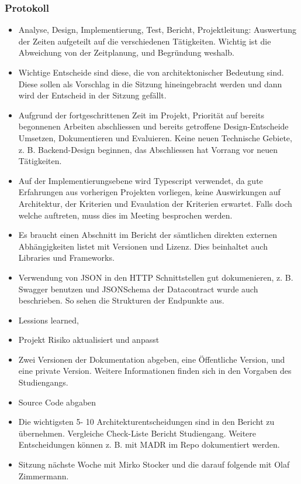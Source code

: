 \documentclass{article}
\begin{document}
\subsubsection{Protokoll}
\begin{itemize}
    \item Analyse, Design, Implementierung, Test, Bericht, Projektleitung: Auswertung der Zeiten aufgeteilt auf die verschiedenen Tätigkeiten. Wichtig ist die Abweichung von der Zeitplanung, und Begründung weshalb.
    \item Wichtige Entscheide sind diese, die von architektonischer Bedeutung sind. Diese sollen als Vorschlag in die Sitzung hineingebracht werden und dann wird der Entscheid in der Sitzung gefällt.
    \item Aufgrund der fortgeschrittenen Zeit im Projekt, Priorität auf bereits begonnenen Arbeiten abschliessen und bereits getroffene Design-Entscheide Umsetzen, Dokumentieren und Evaluieren. Keine neuen Technische Gebiete, z. B. Backend-Design beginnen, das Abschliessen hat Vorrang vor neuen Tätigkeiten.
    \item Auf der Implementierungsebene wird Typescript verwendet, da gute Erfahrungen aus vorherigen Projekten vorliegen, keine Auswirkungen auf Architektur, der Kriterien und Evaulation der Kriterien erwartet. Falls doch welche auftreten, muss dies im Meeting besprochen werden.
    \item Es braucht einen Abschnitt im Bericht der sämtlichen direkten externen Abhängigkeiten listet mit Versionen und Lizenz. Dies beinhaltet auch Libraries und Frameworks.
    \item Verwendung von JSON in den HTTP Schnittstellen gut dokumenieren, z. B. Swagger benutzen und JSONSchema der Datacontract wurde auch beschrieben. So sehen die Strukturen der Endpunkte aus. 
    \item Lessions learned,
    \item Projekt Risiko aktualisiert und anpasst
    \item Zwei Versionen der Dokumentation abgeben, eine Öffentliche Version, und eine private Version. Weitere Informationen finden sich in den Vorgaben des Studiengangs.
    \item Source Code abgaben
    \item Die wichtigsten 5- 10 Architekturentscheidungen sind in den Bericht zu übernehmen. Vergleiche Check-Liste Bericht Studiengang. Weitere Entscheidungen können z. B. mit MADR im Repo dokumentiert werden.
    \item Sitzung nächste Woche mit Mirko Stocker und die darauf folgende mit Olaf Zimmermann.
\end{itemize}
\end{document}
